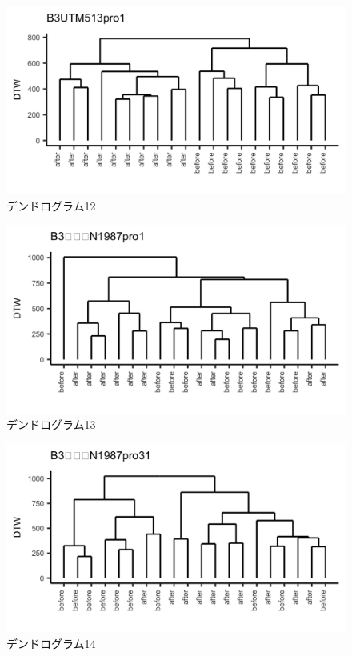 \documentclass{jarticle}
\begin{document}
\begin{figure}[H]
	\begin{center}
		\includegraphics[width=15cm]{fig/dendro_12.png}
		\caption{デンドログラム12}
		\label{fig:dendro12}
	\end{center}
\end{figure}
\begin{figure}[H]
	\begin{center}
		\includegraphics[width=15cm]{fig/dendro_13.png}
		\caption{デンドログラム13}
		\label{fig:dendro13}
	\end{center}
\end{figure}
\begin{figure}[H]
	\begin{center}
		\includegraphics[width=15cm]{fig/dendro_14.png}
		\caption{デンドログラム14}
		\label{fig:dendro14}
	\end{center}
\end{figure}
\end{document}

